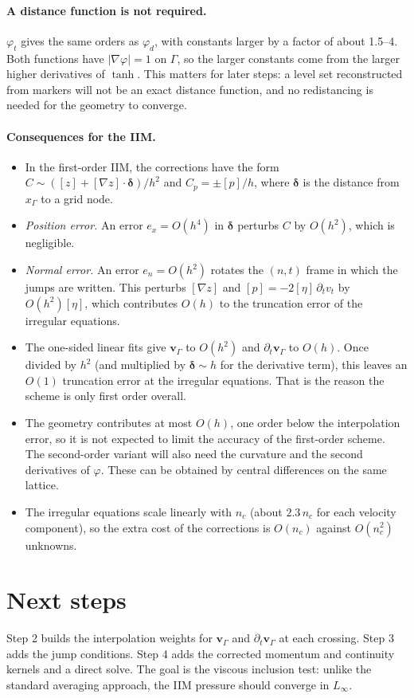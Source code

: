 \documentclass[11pt,a4paper]{article}
\begin{document}
\paragraph{A distance function is not required.}
$\varphi_t$ gives the same orders as $\varphi_d$, with constants larger by a factor of about
1.5--4. Both functions have $|\nabla\varphi|=1$ on $\Gamma$, so the larger constants come from
the larger higher derivatives of $\tanh$. This matters for later steps: a level set reconstructed from
markers will not be an exact distance function, and no redistancing is needed for the geometry
to converge.

\paragraph{Consequences for the IIM.}
\begin{itemize}
  \item In the first-order IIM, the corrections have the form
    $C\sim([z]+[\nabla z]\cdot\boldsymbol\delta)/h^2$ and $C_p=\pm[p]/h$, where
    $\boldsymbol\delta$ is the distance from $x_\Gamma$ to a grid node.
  \item \emph{Position error.} An error $e_x=O(h^4)$ in $\boldsymbol\delta$ perturbs $C$ by
    $O(h^2)$, which is negligible.
  \item \emph{Normal error.} An error $e_n=O(h^2)$ rotates the $(n,t)$ frame in which the jumps
    are written. This perturbs $[\nabla z]$ and $[p]=-2[\eta]\,\partial_t v_t$ by
    $O(h^2)[\eta]$, which contributes $O(h)$ to the truncation error of the irregular
    equations.
  \item The one-sided linear fits give $\mathbf v_\Gamma$ to $O(h^2)$ and
    $\partial_t\mathbf v_\Gamma$ to $O(h)$. Once divided by $h^2$ (and multiplied by
    $\boldsymbol\delta\sim h$ for the derivative term), this leaves an $O(1)$ truncation error at
    the irregular equations. That is the reason the scheme is only first order overall.
  \item The geometry contributes at most $O(h)$, one order below the interpolation error, so it
    is not expected to limit the accuracy of the first-order scheme. The second-order variant
    will also need the curvature and the second derivatives of $\varphi$. These can be obtained
    by central differences on the same lattice.
  \item The irregular equations scale linearly with $n_c$ (about $2.3\,n_c$ for each
    velocity component), so the extra cost of the corrections is $O(n_c)$ against $O(n_c^2)$
    unknowns.
\end{itemize}

\section{Next steps}

Step 2 builds the interpolation weights for $\mathbf v_\Gamma$ and
$\partial_t\mathbf v_\Gamma$ at each crossing. Step 3 adds the jump conditions. Step 4 adds
the corrected momentum and continuity kernels and a direct solve. The goal is the viscous
inclusion test: unlike the standard averaging approach, the IIM pressure should converge in
$L_\infty$.
\end{document}
